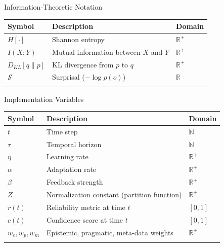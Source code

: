 \documentclass[
  ignorenonframetext,
]{beamer}
\newcounter{none} %
\begin{document}
\begin{frame}{Information-Theoretic Notation}
\protect{}\label{information-theoretic-notation}
{\def\LTcaptype{none} %
\begin{longtable}[]{@{}lll@{}}
\toprule\noalign{}
Symbol & Description & Domain \\
\midrule\noalign{}
\endhead
\(H[\cdot]\) & Shannon entropy & \(\mathbb{R}^+\) \\
\(I(X;Y)\) & Mutual information between \(X\) and \(Y\) &
\(\mathbb{R}^+\) \\
\(D_{KL}[q\|p]\) & KL divergence from \(p\) to \(q\) &
\(\mathbb{R}^+\) \\
\(\mathcal{S}\) & Surprisal (\(-\log p(o)\)) & \(\mathbb{R}\) \\
\bottomrule\noalign{}
\end{longtable}
}
\end{frame}

\begin{frame}{Implementation Variables}
\protect{}\label{implementation-variables}
{\def\LTcaptype{none} %
\begin{longtable}[]{@{}
  >{\raggedright\arraybackslash}p{}
  >{\raggedright\arraybackslash}p{}
  >{\raggedright\arraybackslash}p{}@{}}
\toprule\noalign{}
\begin{minipage}[b]{\linewidth}\raggedright
Symbol
\end{minipage} & \begin{minipage}[b]{\linewidth}\raggedright
Description
\end{minipage} & \begin{minipage}[b]{\linewidth}\raggedright
Domain
\end{minipage} \\
\midrule\noalign{}
\endhead
\(t\) & Time step & \(\mathbb{N}\) \\
\(\tau\) & Temporal horizon & \(\mathbb{N}\) \\
\(\eta\) & Learning rate & \(\mathbb{R}^+\) \\
\(\alpha\) & Adaptation rate & \(\mathbb{R}^+\) \\
\(\beta\) & Feedback strength & \(\mathbb{R}^+\) \\
\(Z\) & Normalization constant (partition function) &
\(\mathbb{R}^+\) \\
\(r(t)\) & Reliability metric at time \(t\) & \([0,1]\) \\
\(c(t)\) & Confidence score at time \(t\) & \([0,1]\) \\
\(w_e, w_p, w_m\) & Epistemic, pragmatic, meta-data weights &
\(\mathbb{R}^+\) \\
\bottomrule\noalign{}
\end{longtable}
}
\end{frame}
\end{document}
